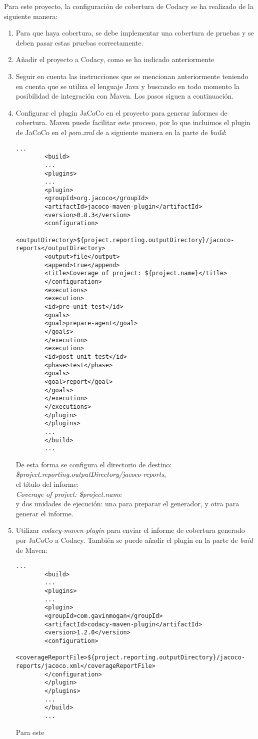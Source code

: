 Para este proyecto, la configuración de cobertura de Codacy se ha realizado de la siguiente manera:
\begin{enumerate}
	\item Para que haya cobertura, se debe implementar una cobertura de pruebas y se deben pasar estas pruebas correctamente.
	
	\item Añadir el proyecto a Codacy, como se ha indicado anteriormente
	
	\item Seguir en cuenta las instrucciones que se mencionan anteriormente teniendo en cuenta que se utiliza el lenguaje Java y buscando en todo momento la posibilidad de integración con Maven. Los pasos siguen a continuación.
	
	\item Configurar el plugin JaCoCo en el proyecto para generar informes de cobertura. Maven puede facilitar este proceso, por lo que incluimos el plugin de JaCoCo en el \textit{pom.xml} de a siguiente manera en la parte de \textit{build}:\\
	{\tiny
		\begin{lstlisting}[breaklines]
		...
		<build>
		...
		<plugins>
		...
		<plugin>
		<groupId>org.jacoco</groupId>
		<artifactId>jacoco-maven-plugin</artifactId>
		<version>0.8.3</version>
		<configuration>
		<outputDirectory>${project.reporting.outputDirectory}/jacoco-reports</outputDirectory>
		<output>file</output>
		<append>true</append>
		<title>Coverage of project: ${project.name}</title>
		</configuration>
		<executions>
		<execution>
		<id>pre-unit-test</id>
		<goals>
		<goal>prepare-agent</goal>
		</goals>
		</execution>
		<execution>
		<id>post-unit-test</id>
		<phase>test</phase>
		<goals>
		<goal>report</goal>
		</goals>
		</execution>
		</executions>
		</plugin>
		</plugins>
		...
		</build>
		...
		\end{lstlisting}
	}
	
	De esta forma se configura el directorio de destino:\\ \textit{\${project.reporting.outputDirectory}/jacoco-reports}, \\el título del informe:\\\textit{Coverage of project: \${project.name}}\\ y dos unidades de ejecución: una para preparar el generador, y otra para generar el informe.
	
	\item Utilizar \textit{codacy-maven-plugin} para enviar el informe de cobertura generado por JaCoCo a Codacy. También se puede añadir el plugin en la parte de \textit{buid} de Maven:
	{\tiny
		\begin{lstlisting}[breaklines]
		...
		<build>
		...
		<plugins>
		...
		<plugin>
		<groupId>com.gavinmogan</groupId>
		<artifactId>codacy-maven-plugin</artifactId>
		<version>1.2.0</version>
		<configuration>
		<coverageReportFile>${project.reporting.outputDirectory}/jacoco-reports/jacoco.xml</coverageReportFile>
		</configuration>
		</plugin>
		</plugins>
		...
		</build>
		...
		\end{lstlisting}
	}
	Para este 
\end{enumerate}

